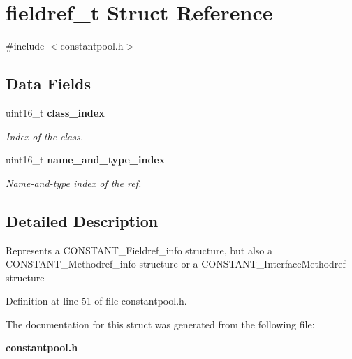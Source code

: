 \section{fieldref\_\-t Struct Reference}
\label{structfieldref__t}


{\ttfamily \#include $<$constantpool.h$>$}

\subsection*{Data Fields}
\begin{DoxyCompactItemize}
\item 
uint16\_\-t {\bf class\_\-index}\label{structfieldref__t_aeec5994f4b795cf8921379ffb4222d4a}

\begin{DoxyCompactList}\small\item\em Index of the class. \item\end{DoxyCompactList}\item 
uint16\_\-t {\bf name\_\-and\_\-type\_\-index}\label{structfieldref__t_aff865bdad19a6504a6965b24fdb5563b}

\begin{DoxyCompactList}\small\item\em Name-\/and-\/type index of the ref. \item\end{DoxyCompactList}\end{DoxyCompactItemize}


\subsection{Detailed Description}
Represents a CONSTANT\_\-Fieldref\_\-info structure, but also a CONSTANT\_\-Methodref\_\-info structure or a CONSTANT\_\-InterfaceMethodref structure 

Definition at line 51 of file constantpool.h.



The documentation for this struct was generated from the following file:\begin{DoxyCompactItemize}
\item 
{\bf constantpool.h}\end{DoxyCompactItemize}
